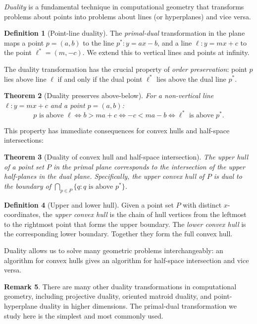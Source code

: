 \documentclass[twoside,12pt]{book}
\theoremstyle{plain}
\newtheorem{theorem}{Theorem}[chapter]
\theoremstyle{definition}
\newtheorem{definition}[theorem]{Definition}
\newtheorem{remark}[theorem]{Remark}
\theoremstyle{remark}
\begin{document}
\emph{Duality} is a fundamental technique in computational geometry that transforms problems about points into problems about lines (or hyperplanes) and vice versa.

\begin{definition}[Point-line duality]
The \emph{primal-dual} transformation in the plane maps a point $p = (a, b)$ to the line $p^* : y = ax - b$, and a line $\ell : y = mx + c$ to the point $\ell^* = (m, -c)$. We extend this to vertical lines and points at infinity.
\end{definition}

The duality transformation has the crucial property of \emph{order preservation}: point $p$ lies above line $\ell$ if and only if the dual point $\ell^*$ lies above the dual line $p^*$.

\begin{theorem}[Duality preserves above-below]
For a non-vertical line $\ell: y = mx + c$ and a point $p = (a, b)$:
\[
p \text{ is above } \ell \iff b > ma + c \iff -c < ma - b \iff \ell^* \text{ is above } p^*.
\]
\end{theorem}

This property has immediate consequences for convex hulls and half-space intersections:

\begin{theorem}[Duality of convex hull and half-space intersection]
The upper hull of a point set $P$ in the primal plane corresponds to the intersection of the upper half-planes in the dual plane. Specifically, the upper convex hull of $P$ is dual to the boundary of $\bigcap_{p \in P} \{q : q \text{ is above } p^*\}$.
\end{theorem}

\begin{definition}[Upper and lower hull]
Given a point set $P$ with distinct $x$-coordinates, the \emph{upper convex hull} is the chain of hull vertices from the leftmost to the rightmost point that forms the upper boundary. The \emph{lower convex hull} is the corresponding lower boundary. Together they form the full convex hull.
\end{definition}

Duality allows us to solve many geometric problems interchangeably: an algorithm for convex hulls gives an algorithm for half-space intersection and vice versa.

\begin{remark}
There are many other duality transformations in computational geometry, including projective duality, oriented matroid duality, and point-hyperplane duality in higher dimensions. The primal-dual transformation we study here is the simplest and most commonly used.
\end{remark}
\end{document}
